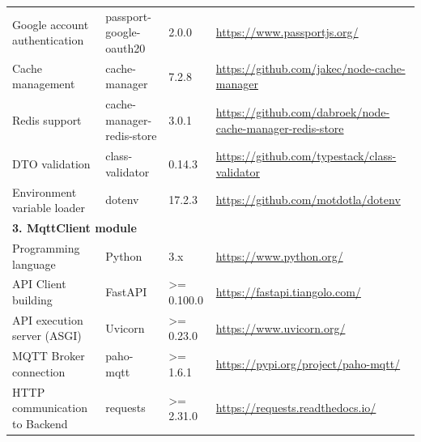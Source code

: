 \documentclass[../Main.tex]{subfiles}
\begin{document}
\begin{longtable}{ p{} p{} p{} p{} }
    Google account authentication   & passport-google-oauth20               & 2.0.0            & \url{https://www.passportjs.org/}                               \\
    Cache management                & cache-manager                         & 7.2.8            & \url{https://github.com/jakec/node-cache-manager}               \\
    Redis support                   & cache-manager-redis-store             & 3.0.1            & \url{https://github.com/dabroek/node-cache-manager-redis-store} \\
    DTO validation                  & class-validator                       & 0.14.3           & \url{https://github.com/typestack/class-validator}              \\
    Environment variable loader     & dotenv                                & 17.2.3           & \url{https://github.com/motdotla/dotenv}                        \\ \hline

    \multicolumn{4}{l}{\textbf{3. MqttClient module}}                                                                              \\ \hline
    Programming language            & Python                                & 3.x              & \url{https://www.python.org/}                                   \\
    API Client building             & FastAPI                               & >= 0.100.0       & \url{https://fastapi.tiangolo.com/}                             \\
    API execution server (ASGI)     & Uvicorn                               & >= 0.23.0        & \url{https://www.uvicorn.org/}                                  \\
    MQTT Broker connection          & paho-mqtt                             & >= 1.6.1         & \url{https://pypi.org/project/paho-mqtt/}                       \\
    HTTP communication to Backend   & requests                              & >= 2.31.0        & \url{https://requests.readthedocs.io/}                          \\ \hline


\end{longtable}
\end{document}
